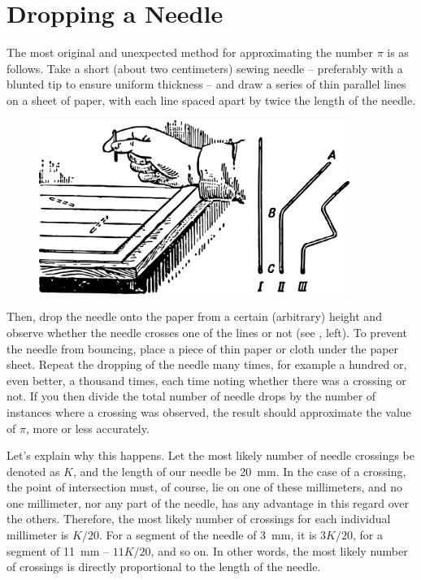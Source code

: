 \section{Dropping a Needle}
\label{sec-9.4}


The most original and unexpected method for approximating the number $\pi$ is as follows. Take a short (about two centimeters) sewing needle -- preferably with a blunted tip to ensure uniform thickness -- and draw a series of thin parallel lines on a sheet of paper, with each line spaced apart by twice the length of the needle.

\begin{figure}[h!]
\centering
\includegraphics[width=0.9\textwidth]{figures/ch-09/fig-124.pdf}
\end{figure}

Then, drop the needle onto the paper from a certain (arbitrary) height and observe whether the needle crosses one of the lines or not (see , left). To prevent the needle from bouncing, place a piece of thin paper or cloth under the paper sheet. Repeat the dropping of the needle many times, for example a hundred or, even better, a thousand times, each time noting whether there was a crossing or not. If you then divide the total number of needle drops by the number of instances where a crossing was observed, the result should approximate the value of $\pi$, more or less accurately.

Let's explain why this happens. Let the most likely number of needle crossings be denoted as  $K$, and the length of our needle be \SI{20}{\milli\meter}. In the case of a crossing, the point of intersection must, of course, lie on one of these millimeters, and no one millimeter, nor any part of the needle, has any advantage in this regard over the others. Therefore, the most likely number of crossings for each individual millimeter is $K/20$. For a segment of the needle of \SI{3}{\milli\meter}, it is $ 3K/20$, for a segment of \SI{11}{\milli\meter} -- $ 11K/20$, and so on. In other words, the most likely number of crossings is directly proportional to the length of the needle.

